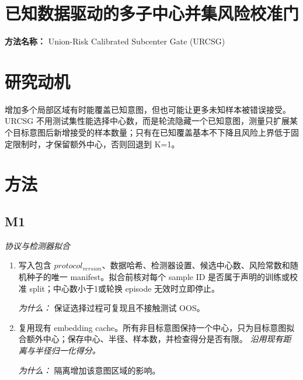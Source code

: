 \documentclass[10pt,a4paper]{article}
\begin{document}
\section*{已知数据驱动的多子中心并集风险校准门}
\textbf{方法名称：} Union-Risk Calibrated Subcenter Gate (URCSG)
\section*{研究动机}
增加多个局部区域有时能覆盖已知意图，但也可能让更多未知样本被错误接受。URCSG 不用测试集性能选择中心数，而是轮流隐藏一个已知意图，测量只扩展某个目标意图后新增接受的样本数量；只有在已知覆盖基本不下降且风险上界低于固定限制时，才保留额外中心，否则回退到 K=1。
\section*{方法}
\subsection*{M1}
\emph{协议与检测器拟合}
\begin{enumerate}[leftmargin=*,start=1]
  \item 写入包含 \(protocol_{version}\)、数据哈希、检测器设置、候选中心数、风险常数和随机种子的唯一 manifest。拟合前核对每个 sample ID 是否属于声明的训练或校准 split；中心数小于1或轮换 episode 无效时立即停止。
\par\emph{为什么：} 保证选择过程可复现且不接触测试 OOS。
  \item 复用现有 embedding cache。所有非目标意图保持一个中心，只为目标意图拟合额外中心；保存中心、半径、样本数，并检查得分是否有限。
\noindent\emph{沿用现有距离与半径归一化得分。}
\par{}
\par\emph{为什么：} 隔离增加该意图区域的影响。
\end{enumerate}
\end{document}
